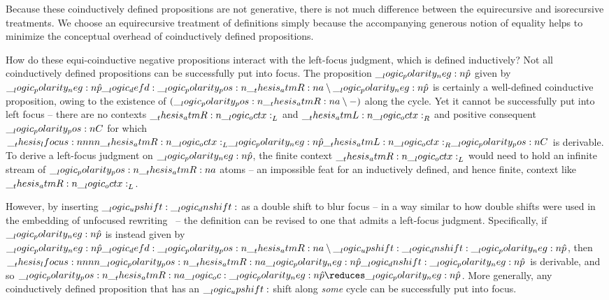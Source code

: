 Because these coinductively defined propositions are not generative\autocite{??}, there is not much difference between the equirecursive and isorecursive treatments.
We choose an equirecursive treatment of definitions simply because the accompanying generous notion of equality helps to minimize the conceptual overhead of coinductively defined propositions.

How do these equi-coinductive negative propositions interact with the left-focus judgment, which is defined inductively?
Not all coinductively defined propositions can be successfully put into focus.
The proposition $\__logic_polarity_neg:n {\hat{p}}$ given by $\__logic_polarity_neg:n {\hat{p}} \__logic_defd: \__logic_polarity_pos:n {\__thesis_atmR:n {a}} \mathbin { \setminus } \__logic_polarity_neg:n {\hat{p}}$ is certainly a well-defined coinductive proposition, owing to the existence of $(\__logic_polarity_pos:n {\__thesis_atmR:n {a}} \mathbin { \setminus } \mathord{-})$ along the cycle.
Yet it cannot be successfully put into left focus -- there are no contexts $\__thesis_atmR:n {\__logic_octx:}_L$ and $\__thesis_atmL:n {\__logic_octx:}_R$ and positive consequent $\__logic_polarity_pos:n {C}$ for which $\__thesis_lfocus:nnnn {\__thesis_atmR:n {\__logic_octx:}_L} {\__logic_polarity_neg:n {\hat{p}}} {\__thesis_atmL:n {\__logic_octx:}_R} {\__logic_polarity_pos:n {C}}$ is derivable.
To derive a left-focus judgment on $\__logic_polarity_neg:n {\hat{p}}$, the finite context $\__thesis_atmR:n {\__logic_octx:}_L$ would need to hold an infinite stream of $\__logic_polarity_pos:n {\__thesis_atmR:n {a}}$ atoms -- an impossible feat for an inductively defined, and hence finite, context like $\__thesis_atmR:n {\__logic_octx:}_L$.


However, by inserting $\__logic_upshift: \__logic_dnshift:$ as a double shift to blur focus -- in a way similar to how double shifts were used in the embedding of unfocused rewriting~ -- the definition can be revised to one that admits a left-focus judgment.
Specifically, if $\__logic_polarity_neg:n {\hat{p}}$ is instead given by $\__logic_polarity_neg:n {\hat{p}} \__logic_defd: \__logic_polarity_pos:n {\__thesis_atmR:n {a}} \mathbin { \setminus } \__logic_upshift: \__logic_dnshift: \__logic_polarity_neg:n {\hat{p}}$, then $\__thesis_lfocus:nnnn {\__logic_polarity_pos:n {\__thesis_atmR:n {a}}} {\__logic_polarity_neg:n {\hat{p}}} {} {\__logic_dnshift: \__logic_polarity_neg:n {\hat{p}}}$ is derivable, and so $\p{\atmR{a}} \oc \n{\defp{p}} \reduces \n{\defp{p}}$.
More generally, any coinductively defined proposition that has an $\__logic_upshift:$ shift along \emph{some} cycle can be successfully put into focus.


